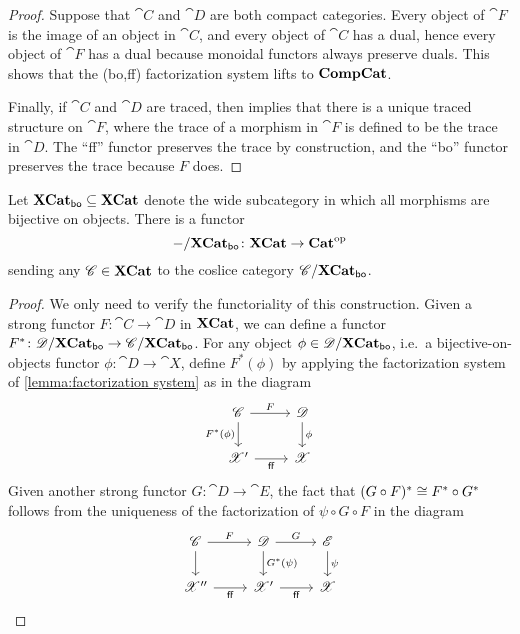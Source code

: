 \documentclass[12pt,oneside,article,draft]{memoir}
\begin{document}
\begin{proof}
Suppose that $\cat{C}$ and $\cat{D}$ are both compact categories. Every object of $\cat{F}$ is the image of an object in $\cat{C}$, and every object of $\cat{C}$ has a dual, hence every object of $\cat{F}$ has a dual because monoidal functors always preserve duals. This shows that the (bo,ff) factorization system lifts to $\mathbf{CompCat}$.

Finally, if $\cat{C}$ and $\cat{D}$ are traced, then \cite[Proposition 2.4]{Joyal-Street-Vertity} implies that there is a unique traced structure on $\cat{F}$, where the trace of a morphism in $\cat{F}$ is defined to be the trace in $\cat{D}$. The ``ff'' functor preserves the trace by construction, and the ``bo'' functor preserves the trace because $F$ does.
\end{proof}

\begin{proposition}\label{prop:coslice Xbo}
  Let $\mathbf{XCat}_{\mathsf{bo}}\subseteq\mathbf{XCat}$ denote the wide subcategory in which all morphisms are bijective on objects.
 There is a functor 
  $$-/\mathbf{XCat}_{\mathsf{bo}}\colon\mathbf{XCat}\to{\mathbf{Cat}}^{\text{op}}$$
  sending any $\mathscr{C}\in\mathbf{XCat}$ to the coslice category $\mathscr{C}/\mathbf{XCat}_{\mathsf{bo}}$.
  \end{proposition}
\begin{proof}
  We only need to verify the functoriality of this construction. Given a strong functor $F\colon\cat{C}\to\cat{D}$ in $\mathbf{XCat}$, we can define a functor $F^*\colon\mathscr{D}/\mathbf{XCat}_{\mathsf{bo}}\to\mathscr{C}/\mathbf{XCat}_{\mathsf{bo}}$. For any object $\phi\in\mathscr{D}/\mathbf{XCat}_{\mathsf{bo}}$, i.e.~a bijective-on-objects functor $\phi\colon\cat{D}\to\cat{X}$, define $F^*(\phi)$ by applying the factorization system of \ref{lemma:factorization system} as in the diagram
  \[
  \begin{tikzcd}
    \cat{C} \ar[r,"F"] \ar[d,"F^*(\phi)"'] & \cat{D} \ar[d,"\phi"] \\
    \cat{X}' \ar[r,"\ff"'] & \cat{X}
  \end{tikzcd}
  \]
  Given another strong functor $G\colon\cat{D}\to\cat{E}$, the fact that $(G\circ F)^*\cong F^*\circ G^*$ follows from the uniqueness of the factorization of $\psi\circ G\circ F$ in the diagram
  \[
  \begin{tikzcd}
    \cat{C} \ar[r,"F"] \ar[d] 
      & \cat{D} \ar[r,"G"] \ar[d,"G^*(\psi)"] 
      & \cat{E} \ar[d,"\psi"] \\
    \cat{X}'' \ar[r,"\ff"'] & \cat{X}' \ar[r,"\ff"'] & \cat{X}
  \end{tikzcd}
  \]
\end{proof}
\end{document}
